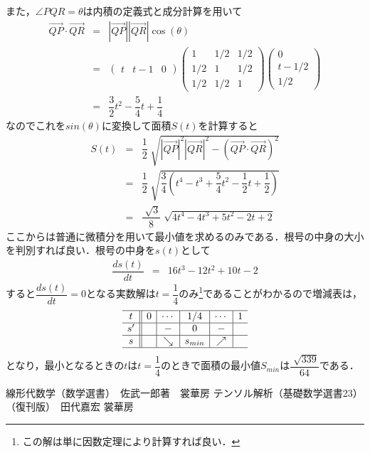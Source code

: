 \documentclass[dvipdfmx,a4]{jsarticle}
\begin{document}
また，\(\angle PQR=\theta\)は内積の定義式と成分計算を用いて
\begin{eqnarray*}
  \overrightarrow{QP}\cdot \overrightarrow{QR}
  &=&
  |\overrightarrow{QP}||\overrightarrow{QR}| \cos(\theta)\\
  &=&
  \begin{pmatrix}
    t & t-1 & 0
  \end{pmatrix}
  \begin{pmatrix}
    1 & 1/2 & 1/2 \\ 
    1/2 & 1 & 1/2 \\
    1/2 & 1/2 & 1
  \end{pmatrix}
  \begin{pmatrix}
    0\\
    t-1/2\\
    1/2
  \end{pmatrix}\\
  &=&
  \dfrac{3}{2}t^2-\dfrac{5}{4}t+\dfrac{1}{4}
\end{eqnarray*}
なのでこれを\(sin(\theta)\)に変換して面積\(S(t)\)を計算すると
\begin{eqnarray*}
  S(t) &=& 
  \dfrac{1}{2}\sqrt[]{|\overrightarrow{QP}|^2|\overrightarrow{QR}|^2 -(\overrightarrow{QP}\cdot \overrightarrow{QR})^2}\\
  &=& \dfrac{1}{2} \sqrt[]{\dfrac{3}{4} \left( t^4 -t^3 +\dfrac{5}{4} t^2 -\dfrac{1}{2} t+\dfrac{1}{2}\right)} \\
  &=& \dfrac{\sqrt[]{3}}{8} \sqrt[]{4t^4 -4t^3 +5 t^2 -2 t+2}
\end{eqnarray*}
ここからは普通に微積分を用いて最小値を求めるのみである．根号の中身の大小を判別すれば良い．根号の中身を\(s(t)\)として
\begin{eqnarray*}
  \dfrac{ds(t)}{dt} &=&
  16t^3-12t^2+10t-2
\end{eqnarray*}
すると\(\dfrac{ds(t)}{dt}=0\)となる実数解は\(t=\dfrac{1}{4}\)のみ\footnote{この解は単に因数定理により計算すれば良い．}であることがわかるので増減表は，
 \[
 \begin{array}{c||c|c|c|c|c}
 \hline
 t&0&\cdots&1/4&\cdots&1\\
 \hline
 s'&&-&0&-&\\
 \hline
 s&&\searrow&s_{min}&\nearrow&\\
 \hline
 \end{array}
 \]
となり，最小となるときの\(t\)は\(t=\dfrac{1}{4}\)のときで面積の最小値\(S_{min}\)は\(\dfrac{\sqrt[]{339}}{64}\)である．

\begin{thebibliography}{9}
 線形代数学（数学選書）　佐武一郎著　裳華房
 テンソル解析（基礎数学選書23）（復刊版）　田代嘉宏 裳華房
\end{thebibliography}
\end{document}
